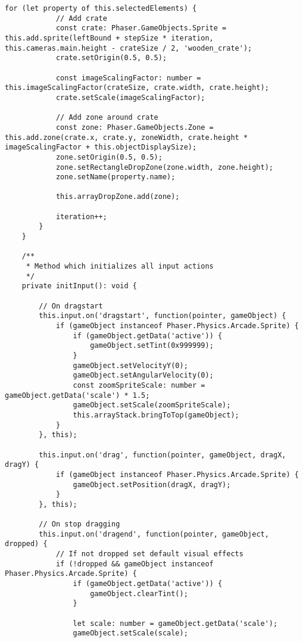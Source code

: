 \begin{lstlisting}[style=TypeScript, caption={propertySortingScene.ts}]
        for (let property of this.selectedElements) {
            // Add crate
            const crate: Phaser.GameObjects.Sprite = this.add.sprite(leftBound + stepSize * iteration, this.cameras.main.height - crateSize / 2, 'wooden_crate');
            crate.setOrigin(0.5, 0.5);

            const imageScalingFactor: number = this.imageScalingFactor(crateSize, crate.width, crate.height);
            crate.setScale(imageScalingFactor);

            // Add zone around crate
            const zone: Phaser.GameObjects.Zone = this.add.zone(crate.x, crate.y, zoneWidth, crate.height * imageScalingFactor + this.objectDisplaySize);
            zone.setOrigin(0.5, 0.5);
            zone.setRectangleDropZone(zone.width, zone.height);
            zone.setName(property.name);

            this.arrayDropZone.add(zone);

            iteration++;
        }
    }

    /**
     * Method which initializes all input actions
     */
    private initInput(): void {

        // On dragstart
        this.input.on('dragstart', function(pointer, gameObject) {
            if (gameObject instanceof Phaser.Physics.Arcade.Sprite) {
                if (gameObject.getData('active')) {
                    gameObject.setTint(0x999999);
                }
                gameObject.setVelocityY(0);
                gameObject.setAngularVelocity(0);
                const zoomSpriteScale: number = gameObject.getData('scale') * 1.5;
                gameObject.setScale(zoomSpriteScale);
                this.arrayStack.bringToTop(gameObject);
            }
        }, this);

        this.input.on('drag', function(pointer, gameObject, dragX, dragY) {
            if (gameObject instanceof Phaser.Physics.Arcade.Sprite) {
                gameObject.setPosition(dragX, dragY);
            }
        }, this);

        // On stop dragging
        this.input.on('dragend', function(pointer, gameObject, dropped) {
            // If not dropped set default visual effects
            if (!dropped && gameObject instanceof Phaser.Physics.Arcade.Sprite) {
                if (gameObject.getData('active')) {
                    gameObject.clearTint();
                }

                let scale: number = gameObject.getData('scale');
                gameObject.setScale(scale);


\end{lstlisting}
